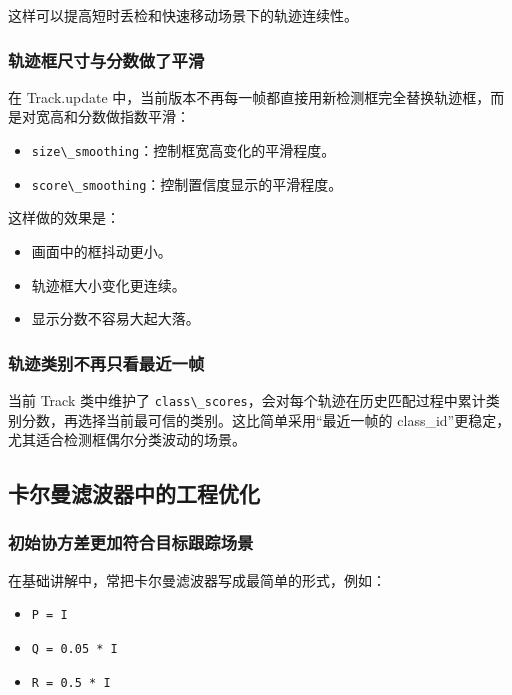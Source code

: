 这样可以提高短时丢检和快速移动场景下的轨迹连续性。

\subsubsection{轨迹框尺寸与分数做了平滑}\label{src-experiment-case2-h84}

在 Track.update
中，当前版本不再每一帧都直接用新检测框完全替换轨迹框，而是对宽高和分数做指数平滑：

\begin{itemize}
\tightlist
\item
  \passthrough{\lstinline!size\_smoothing!}：控制框宽高变化的平滑程度。
\item
  \passthrough{\lstinline!score\_smoothing!}：控制置信度显示的平滑程度。
\end{itemize}

这样做的效果是：

\begin{itemize}
\tightlist
\item
  画面中的框抖动更小。
\item
  轨迹框大小变化更连续。
\item
  显示分数不容易大起大落。
\end{itemize}

\subsubsection{轨迹类别不再只看最近一帧}\label{src-experiment-case2-h85}

当前 Track 类中维护了
\passthrough{\lstinline!class\_scores!}，会对每个轨迹在历史匹配过程中累计类别分数，再选择当前最可信的类别。这比简单采用``最近一帧的
class\_id''更稳定，尤其适合检测框偶尔分类波动的场景。

\subsection{卡尔曼滤波器中的工程优化}\label{src-experiment-case2-h86}

\subsubsection{初始协方差更加符合目标跟踪场景}\label{src-experiment-case2-h87}

在基础讲解中，常把卡尔曼滤波器写成最简单的形式，例如：

\begin{itemize}
\tightlist
\item
  \passthrough{\lstinline!P = I!}
\item
  \passthrough{\lstinline!Q = 0.05 * I!}
\item
  \passthrough{\lstinline!R = 0.5 * I!}
\end{itemize}

